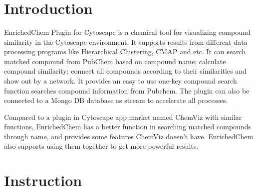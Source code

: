 \documentclass{article}
\title{ \small{}}
\author{}
\date{}
\begin{document}
	\maketitle
	\begin{abstract}
		
	\end{abstract}

\section{Introduction}
EnrichedChem Plugin for Cytoscape is a chemical tool for visualizing compound
similarity in the Cytoscape environment. It supports results from different data
processing programs like Hierarchical Clustering, CMAP and etc. It can search
matched compound from PubChem based on compound name; calculate compound
similarity; connect all compounds according to their similarities and show out
by a network. It provides an easy to use one-key compound search function
searches compound information from Pubchem. The plugin can also be connected to
a Mongo DB database as stream to accelerate all processes.

Compared to a plugin in Cytoscape app market named ChemViz with similar
functions, EnrichedChem has a better function in searching matched compounds
through name, and provides some features ChemViz doesn't have. EnrichedChem also
supports using them together to get more powerful results.

\section{Instruction}
\end{document}

